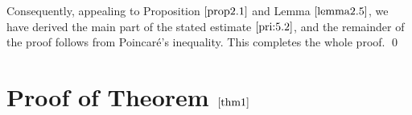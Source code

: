 \documentclass[13pt,CJK]{article}
\theoremstyle{plain}                       %
\theoremstyle{remark}
\numberwithin{equation}{section}
\begin{document}
Consequently, appealing to Proposition $\ref{prop2.1}$ and Lemma $\ref{lemma2.5}$,
we have derived the main part of the stated estimate $\eqref{pri:5.2}$, and
the remainder of the proof follows from Poincar\'e's inequality. This
completes the whole proof.
\qed









\section{Proof of Theorem $\ref{thm1}$}\label{sec5}
\end{document}
